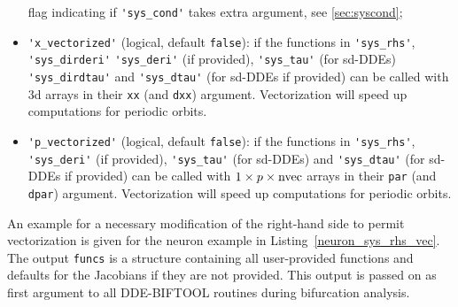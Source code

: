 \documentclass[10pt]{scrartcl}
\newcommand{\DDEBIFCODE}{\textsc{DDE-BIFTOOL}}
\newcommand{\blist}[1]{\mbox{\lstinline!#1!}}
\begin{document}
\begin{itemize}
  flag indicating if \blist{'sys_cond'} takes extra argument, see \cref{sec:syscond};
\item \blist{'x_vectorized'} (logical, default \blist{false}): if the
  functions in \blist{'sys_rhs'}, \blist{'sys_dirderi'}
  \blist{'sys_deri'} (if provided), \blist{'sys_tau'} (for sd-DDEs)
  \blist{'sys_dirdtau'} and \blist{'sys_dtau'} (for sd-DDEs if
  provided) can be called with $3$d arrays in their \blist{xx} (and
  \blist{dxx}) argument. Vectorization will speed up computations for
  periodic orbits.
\item \blist{'p_vectorized'} (logical, default \blist{false}): if the
  functions in \blist{'sys_rhs'}, \blist{'sys_deri'} (if provided),
  \blist{'sys_tau'} (for sd-DDEs) and \blist{'sys_dtau'} (for sd-DDEs
  if provided) can be called with $1\times p\times \blist{nvec}$
  arrays in their \blist{par} (and \blist{dpar})
  argument. Vectorization will speed up computations for periodic
  orbits.
\end{itemize}
An example for a necessary modification of the right-hand side to
permit vectorization is given for the neuron example in
Listing~\ref{neuron_sys_rhs_vec}. The output \blist{funcs} is a
structure containing all user-provided functions and defaults for the
Jacobians if they are not provided. This output is passed on as first
argument to all \DDEBIFCODE{} routines during bifurcation analysis.
\end{document}
